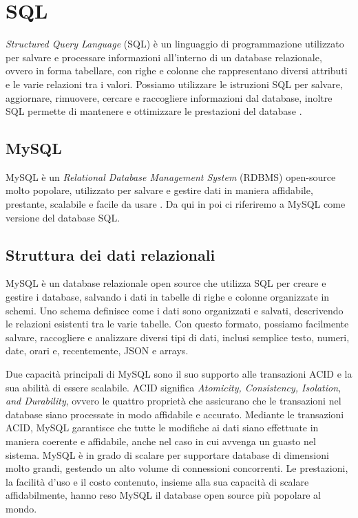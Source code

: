\section{SQL}
\textit{Structured Query Language} (SQL) è un linguaggio di programmazione utilizzato per salvare e processare informazioni all'interno di un database relazionale, ovvero in forma tabellare, con righe e colonne che rappresentano diversi attributi e le varie relazioni tra i valori. Possiamo utilizzare le istruzioni SQL per salvare, aggiornare, rimuovere, cercare e raccogliere informazioni dal database, inoltre SQL permette di mantenere e ottimizzare le prestazioni del database \cite{SQL, MySQL_Docs}.

\subsection{MySQL}
MySQL è un \textit{Relational Database Management System} (RDBMS) open-source molto popolare, utilizzato per salvare e gestire dati in maniera affidabile, prestante, scalabile e facile da usare \cite{MySQL,MySQL_Docs}. Da qui in poi ci riferiremo a MySQL come versione del database SQL.

\subsection{Struttura dei dati relazionali}
MySQL è un database relazionale open source che utilizza SQL per creare e gestire i database, salvando i dati in tabelle di righe e colonne organizzate in schemi. Uno schema definisce come i dati sono organizzati e salvati, descrivendo le relazioni esistenti tra le varie tabelle. Con questo formato, possiamo facilmente salvare, raccogliere e analizzare diversi tipi di dati, inclusi semplice testo, numeri, date, orari e, recentemente, JSON e arrays.

Due capacità principali di MySQL sono il suo supporto alle transazioni ACID e la sua abilità di essere scalabile. ACID significa \textit{Atomicity, Consistency, Isolation, and Durability}, ovvero le quattro proprietà che assicurano che le transazioni nel database siano processate in modo affidabile e accurato. Mediante le transazioni ACID, MySQL garantisce che tutte le modifiche ai dati siano effettuate in maniera coerente e affidabile, anche nel caso in cui avvenga un guasto nel sistema. MySQL è in grado di scalare per supportare database di dimensioni molto grandi, gestendo un alto volume di connessioni concorrenti. Le prestazioni, la facilità d'uso e il costo contenuto, insieme alla sua capacità di scalare affidabilmente, hanno reso MySQL il database open source più popolare al mondo.

